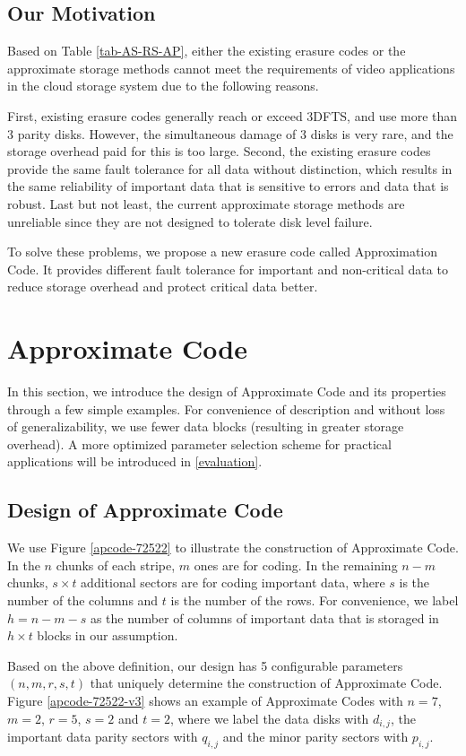 \documentclass[sigconf]{acmart}
\begin{document}
\subsection{Our Motivation}
Based on Table \ref{tab-AS-RS-AP}, either the existing erasure codes or the approximate storage methods cannot meet the requirements of video applications in the cloud storage system due to the following reasons. 

First, existing erasure codes generally reach or exceed 3DFTS, and use more than 3 parity disks. However, the simultaneous damage of 3 disks is very rare, and the storage overhead paid for this is too large. Second, the existing erasure codes provide the same fault tolerance for all data without distinction, which results in the same reliability of important data that is sensitive to errors and data that is robust. Last but not least, the current approximate storage methods are unreliable since they are not designed to tolerate disk level failure.

To solve these problems, we propose a new erasure code called Approximation Code. It provides different fault tolerance for important and non-critical data to reduce storage overhead and protect critical data better.

\section{Approximate Code}\label{ApCode}
In this section, we introduce the design of Approximate Code and its properties through a few simple examples. For convenience of description and without loss of generalizability, we use fewer data blocks (resulting in greater storage overhead). A more optimized parameter selection scheme for practical applications will be introduced in \ref{evaluation}.

\subsection{Design of Approximate Code}
We use Figure \ref{apcode-72522} to illustrate the construction of Approximate Code.
In the $n$ chunks of each stripe, $m$ ones are for coding.
In the remaining $n-m$ chunks, $s \times t$ additional sectors are for coding important data, where $s$ is the number of the columns and $t$ is the number of the rows.
For convenience, we label $h=n-m-s$ as the number of columns of important data that is storaged in $h \times t$ blocks in our assumption.

Based on the above definition, our design has 5 configurable parameters $(n, m, r, s,t)$ that uniquely determine the construction of Approximate Code.
Figure \ref{apcode-72522-v3} shows an example of Approximate Codes with $n = 7$, $m = 2$, $r=5$, $s=2$ and $t = 2$, where we label the data disks with $d_{i,j}$, the important data parity sectors with $q_{i,j}$ and the minor parity sectors with $p_{i,j}$.
\end{document}
